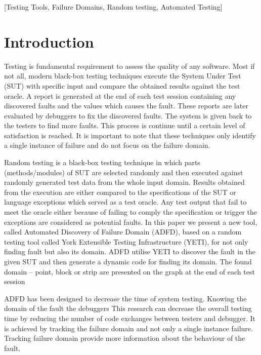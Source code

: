 \documentclass{acm_proc_article-sp}
\begin{document}
[Testing Tools, Failure Domains, Random testing, Automated Testing]

\section{Introduction}\label{sec:intro}

Testing is fundamental requirement to assess the quality of any software. Most if not all, modern black-box testing techniques \cite{Beizer1995} execute the System Under Test (SUT) with specific input 
and compare the obtained results against the test oracle. A report is generated at the end of each test session containing any discovered faults and the values which causes the fault. These reports are later evaluated by debuggers to fix the discovered faults. The system is given back to the testers to find more faults. This process is continue until a certain level of satisfaction is reached. It is important to note that these techniques only identify a single instance of failure and do not  focus on the failure domain. 

Random testing is a black-box testing technique in which parts (methods/modules) of SUT are selected randomly and then executed against randomly generated test data from the whole input domain. Results obtained from the execution are either compared to the specifications of the SUT or language exceptions which served as a test oracle. Any test output that fail to meet the oracle either because of failing to comply the specification or trigger the exceptions are considered as potential faults. In this paper we present a new tool, called Automated Discovery of Failure Domain (ADFD), based on a random testing tool called York Extensible Testing Infrastructure (YETI), for not only finding fault but also its domain. ADFD utilise YETI to discover the fault in the given SUT and then generate a dynamic code for finding its domain. The found domain -- point, block or strip are presented on the graph at the end of each test session


ADFD has been designed to decrease the time of system testing. Knowing the domain of the fault the debuggers This research can decrease the overall testing time by reducing the number of code exchanges between testers and debugger. It is achieved by tracking the failure domain and not only a single instance failure. Tracking failure domain provide more information about the behaviour of the fault.
\end{document}
